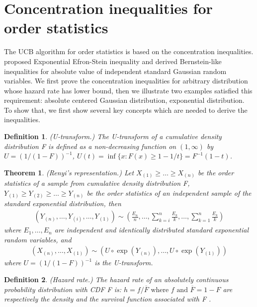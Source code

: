 \documentclass{article}
\theoremstyle{plain}
\newtheorem{theo}{Theorem}
\newtheorem{defi}{Definition}
\begin{document}
\section{Concentration inequalities for order statistics}
The UCB algorithm for order statistics is based on the concentration inequalities. \cite{boucheron2012} proposed Exponential Efron-Stein inequality and derived Bernstein-like inequalities for absolute value of independent standard Gaussian random variables. We first prove the concentration inequalities for arbitrary distribution whose hazard rate has lower bound, then we illustrate two examples satisfied this requirement: absolute centered Gaussian distribution, exponential distribution. To show that, we first show several key concepts which are needed to derive the inequalities.


\begin{defi} (U-transform.)
\label{defi: U-transform}
The U-transform of a cumulative density distribution F is defined as a non-decreasing function on $(1, \infty)$ by $U = (1/(1-F))^{-1}$, $U(t) = \inf\{x: F(x) \geq 1 - 1/t\} = F^{-1}(1-t)$.
\end{defi}

\begin{theo} (Renyi's representation.) Let $X_{(1)} \geq \ldots \geq X_{(n)}$ be the order statistics of a sample from cumulative density distribution F, $Y_{(1)} \geq Y_{(2)} \geq \ldots \geq Y_{(n)}$ be the
order statistics of an independent sample of the standard exponential distribution, then
\begin{align}
    \left(Y_{(n)}, \ldots, Y_{(i)}, \ldots, Y_{(1)}\right) \sim\left(\frac{E_{n}}{n}, \ldots, \sum_{k=i}^{n} \frac{E_{k}}{k}, \ldots, \sum_{k=1}^{n} \frac{E_{k}}{k}\right)
\end{align}
where $E_{1}, \ldots, E_{n}$ are independent and identically distributed standard exponential random variables, and
\begin{align}
    \left(X_{(n)}, \ldots, X_{(1)}\right) \sim\left(U \circ \exp \left(Y_{(n)}\right), \ldots, U \circ \exp \left(Y_{(1)}\right)\right)
\end{align}
where $U=(1 /(1-F))^{-1}$ is the U-transform.
\end{theo}

\begin{defi} (Hazard rate.) The hazard rate of an absolutely continuous probability distribution with CDF F is: $h=f / \overline{F} \text { where } f \text { and } \overline{F}=1-F$ are respectively the density and the survival function associated with F .
\end{defi}
\end{document}
